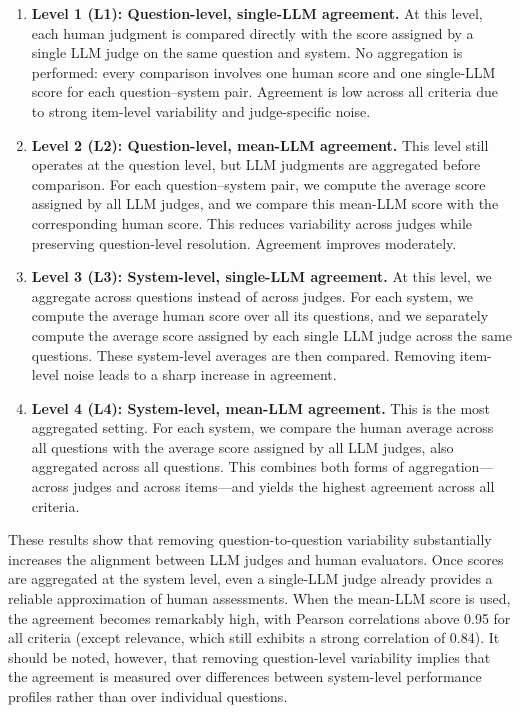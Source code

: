\begin{enumerate}
    \item \textbf{Level 1 (L1): Question-level, single-LLM agreement.}
    At this level, each human judgment is compared directly with the score assigned by a single LLM judge on the same question and system.
    No aggregation is performed: every comparison involves one human score and one single-LLM score for each question–system pair.
    Agreement is low across all criteria due to strong item-level variability and judge-specific noise.

    \item \textbf{Level 2 (L2): Question-level, mean-LLM agreement.}  
    This level still operates at the question level, but LLM judgments are aggregated before comparison.  
    For each question–system pair, we compute the average score assigned by all LLM judges, and we compare this mean-LLM score with the corresponding human score.  
    This reduces variability across judges while preserving question-level resolution.  
    Agreement improves moderately.
    
    \item \textbf{Level 3 (L3): System-level, single-LLM agreement.}  
    At this level, we aggregate across questions instead of across judges.  
    For each system, we compute the average human score over all its questions, and we separately compute the average score assigned by each single LLM judge across the same questions.  
    These system-level averages are then compared.  
    Removing item-level noise leads to a sharp increase in agreement.
    
    \item \textbf{Level 4 (L4): System-level, mean-LLM agreement.}  
    This is the most aggregated setting.  
    For each system, we compare the human average across all questions with the average score assigned by all LLM judges, also aggregated across all questions.  
    This combines both forms of aggregation—across judges and across items—and yields the highest agreement across all criteria.
\end{enumerate}

These results show that removing question-to-question variability substantially increases the alignment between LLM judges and human evaluators.
Once scores are aggregated at the system level, even a single-LLM judge already provides a reliable approximation of human assessments.
When the mean-LLM score is used, the agreement becomes remarkably high, with Pearson correlations above 0.95 for all criteria (except relevance, which still exhibits a strong correlation of 0.84).
It should be noted, however, that removing question-level variability implies that the agreement is measured over differences between system-level performance profiles rather than over individual questions.

